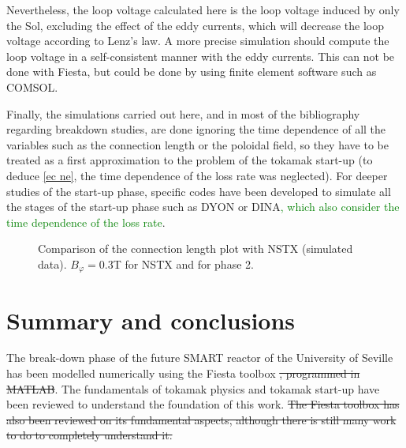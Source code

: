 \documentclass[a4paper,12pt,oneside]{book}
\begin{document}
Nevertheless, the loop voltage calculated here is the loop voltage induced by only the Sol, excluding the effect of the eddy currents, which will decrease the loop voltage according to Lenz's law. A more precise simulation should compute the loop voltage in a self-consistent manner with the eddy currents. This can not be done with Fiesta, but could be done by using finite element software such as COMSOL.

Finally, the simulations carried out here, and in most of the bibliography regarding breakdown studies, are done ignoring the time dependence of all the variables such as the connection length or the poloidal field, so they have to be treated as a first approximation to the problem of the tokamak start-up (to deduce \eqref{ec ne}, the time dependence of the loss rate was neglected). For deeper studies of the start-up phase, specific codes have been developed to simulate all the stages of the start-up phase such as DYON \cite{KimThesis} or DINA\textcolor{green}{, which also consider the time dependence of the loss rate}.

\begin{figure}[htbp]
\centering
{}
\hfill

\hfill
{}



\caption{Comparison of the connection length plot with NSTX \cite{NSTX_2017, NSTX_cross} (simulated data). $B_\varphi=0.3$T for NSTX and for phase 2.}
\label{fig_L_NSTX}
\end{figure}


\chapter{Summary and conclusions} %

The break-down phase of the future SMART reactor of the University of Seville has been modelled numerically using the Fiesta toolbox \st{, programmed in MATLAB}. The fundamentals of tokamak physics and tokamak start-up have been reviewed to understand the foundation of this work. \st{The Fiesta toolbox has also been reviewed on its fundamental aspects, although there is still many work to do to completely understand it.}
\end{document}
